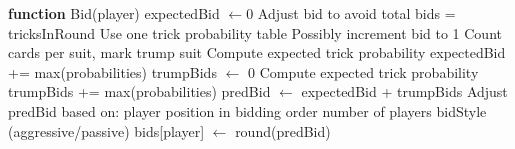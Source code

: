 \documentclass{article}
\begin{document}
\begin{algorithm}[H]
    \caption{Bidding Algorithm}
    \label{alg:bidding}
    \begin{algorithmic}[1]
        \State \textbf{function} Bid(player)
        \State expectedBid $\gets 0$
                \State Adjust bid to avoid total bids = tricksInRound
            \Else
                \State Use one trick probability table
                    \State Possibly increment bid to 1
                \EndIf
            \EndIf
        \Else
            \State Count cards per suit, mark trump suit
                    \State Compute expected trick probability
                    \State expectedBid += max(probabilities)
                \EndFor
            \EndFor
            \State trumpBids $\gets$ 0
                \State Compute expected trick probability
                \State trumpBids += max(probabilities)
            \EndFor
            \State predBid $\gets$ expectedBid + trumpBids
            \State Adjust predBid based on:
            \State \quad player position in bidding order
            \State \quad number of players
            \State \quad bidStyle (aggressive/passive)
        \EndIf
        \State bids[player] $\gets$ round(predBid)
    \end{algorithmic}
\end{algorithm}
\end{document}
